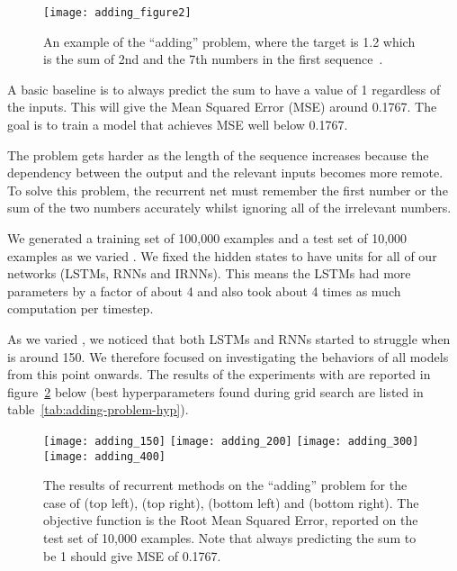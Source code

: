 \documentclass{article} \usepackage{nips14submit_e,times,graphicx}
\begin{document}
\begin{figure}[h!]
\centering
\texttt{[image: adding\_figure2]}
\caption{An example of the ``adding'' problem, where the target is 1.2
  which is the sum of 2nd and the 7th numbers in the first
  sequence~\cite{martens11}.}
\label{fig:add}
\end{figure}



A basic baseline is to always predict the sum to have a value of 1
regardless of the inputs. This will give the Mean Squared Error (MSE)
around 0.1767. The goal is to train a model that achieves MSE well
below 0.1767.

The problem gets harder as the length of the sequence  increases
because the dependency between the output and the relevant inputs
becomes more remote. To solve this problem, the recurrent net must
remember the first number or the sum of the two numbers accurately
whilst ignoring all of the irrelevant numbers.

We generated a training set of 100,000 examples and a test set of
10,000 examples as we varied .  We fixed the hidden states to have
 units for all of our networks (LSTMs, RNNs and IRNNs). This
means the LSTMs had more parameters by a factor of about 4 and also
took about 4 times as much computation per timestep.

As we varied , we noticed that both LSTMs and RNNs started to
struggle when  is around 150. We therefore focused on investigating
the behaviors of all models from this point onwards. The results of
the experiments with  are reported
in figure~\ref{fig:adding} below (best hyperparameters found during
grid search are listed in table~\ref{tab:adding-problem-hyp}).

\begin{figure}[h!]
\centering
\texttt{[image: adding\_150]}
\texttt{[image: adding\_200]}
\texttt{[image: adding\_300]}
\texttt{[image: adding\_400]}
\caption{The results of recurrent methods on the ``adding'' problem
  for the case of  (top left),  (top right), 
  (bottom left) and  (bottom right). The objective function
  is the Root Mean Squared Error, reported on the test set of 10,000
  examples. Note that always predicting the sum to be 1 should give
  MSE of 0.1767.}
\label{fig:adding}
\end{figure}
\end{document}
